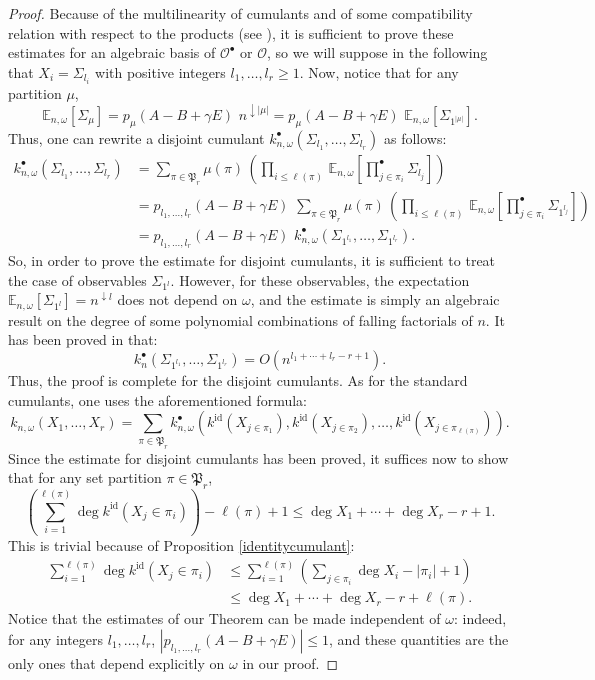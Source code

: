 \documentclass[smallextended,nospthms]{svjour3}
\theoremstyle{remark}
\newcommand{\setpart}{\mathfrak{P}}
\newcommand{\esper}{\mathbb{E}}
\newcommand{\obs}{\mathscr{O}}
\newcommand{\id}{\mathrm{id}}
\begin{document}
\begin{proof}
Because of the multilinearity of cumulants and of some compatibility relation with respect to the products (see \cite[Theorem 4.4]{Sni06b}), it is sufficient to prove these estimates for an algebraic basis of $\obs^{\bullet}$ or $\obs$, so we will suppose in the following that $X_{i}=\varSigma_{l_{i}}$ with positive integers $l_{1},\ldots,l_{r}\geq 1$. Now, notice that for any partition $\mu$,
$$\esper_{n,\omega}[\varSigma_{\mu}]=p_{\mu}(A-B+\gamma E)\,\,n^{\downarrow |\mu|}=p_{\mu}(A-B+\gamma E)\,\,\esper_{n,\omega}[\varSigma_{1^{|\mu|}}].$$
Thus, one can rewrite a disjoint cumulant $k_{n,\omega}^{\bullet}(\varSigma_{l_{1}},\ldots,\varSigma_{l_{r}})$ as follows:
\begin{align*}
k_{n,\omega}^{\bullet}(\varSigma_{l_{1}},\ldots,\varSigma_{l_{r}})&=\sum_{\pi \in \setpart_{r}}\mu(\pi)\,\left(\prod_{i\leq \ell(\pi)}\,\esper_{n,\omega}\!\left[\prod_{j \in \pi_{i}}^{\bullet} \varSigma_{l_{j}}\right]\right)\\
&\!\!\!\!\!\!\!\!\!\!\!\!=p_{l_{1},\ldots,l_{r}}(A-B+\gamma E) \,\,\sum_{\pi \in \setpart_{r}}\mu(\pi)\,\left(\prod_{i\leq \ell(\pi)}\,\esper_{n,\omega}\!\left[\prod_{j \in \pi_{i}}^{\bullet} \varSigma_{1^{l_{j}}}\right]\right)\\
&\!\!\!\!\!\!\!\!\!\!\!\!=p_{l_{1},\ldots,l_{r}}(A-B+\gamma E)\,\,k_{n,\omega}^{\bullet}(\varSigma_{1^{l_{1}}},\ldots,\varSigma_{1^{l_{r}}}).
\end{align*}
So, in order to prove the estimate for disjoint cumulants, it is sufficient to treat the case of observables $\varSigma_{1^{l}}$. However, for these observables, the expectation $\esper_{n,\omega}[\varSigma_{1^{l}}]=n^{\downarrow l}$ does not depend on $\omega$, and the estimate is simply an algebraic result on the degree of some polynomial combinations of falling factorials of $n$. It has been proved in \cite[Lemma 4.8]{Sni06b} that:
$$k^{\bullet}_{n}(\varSigma_{1^{l_{1}}},\ldots, \varSigma_{1^{l_{r}}})=O\left(n^{l_{1}+\cdots+l_{r}-r+1}\right).$$
Thus, the proof is complete for the disjoint cumulants. As for the standard cumulants, one uses the aforementioned formula:
$$k_{n,\omega}(X_{1},\ldots,X_{r})=\sum_{\pi \in \setpart_{r}} k^{\bullet}_{n,\omega}\left(k^{\id}(X_{j \in \pi_{1}}),k^{\id}(X_{j \in \pi_{2}}),\ldots,k^{\id}(X_{j \in \pi_{\ell(\pi)}})\right).$$
Since the estimate for disjoint cumulants has been proved, it suffices now to show that for any set partition $\pi \in \setpart_{r}$,
$$\left(\sum_{i=1}^{\ell(\pi)} \deg k^{\id}(X_{j} \in \pi_{i})\right)- \ell(\pi)+1 \leq \deg X_{1} +\cdots+\deg X_{r} -r+1.$$
This is trivial because of Proposition \ref{identitycumulant}:
\begin{align*}
\sum_{i=1}^{\ell(\pi)} \deg k^{\id}(X_{j} \in \pi_{i})&\leq \sum_{i=1}^{\ell(\pi)} \left(\sum_{j \in \pi_{i}} \deg X_{i}-|\pi_{i}|+1\right)\\
&\leq\deg X_{1}+\cdots+\deg X_{r}-r+\ell(\pi).
\end{align*}
Notice that the estimates of our Theorem can be made independent of $\omega$: indeed, for any integers $l_{1},\ldots,l_{r}$, $|p_{l_{1},\ldots,l_{r}}(A-B+\gamma E)|\leq 1$, and these quantities are the only ones that depend explicitly on $\omega$ in our proof.
\end{proof}
\end{document}
